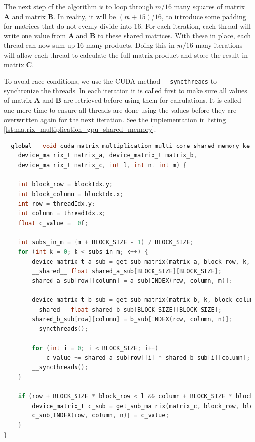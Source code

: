 The next step of the algorithm is to loop through $m / 16$ many squares of matrix $\mathbf{A}$ and matrix $\mathbf{B}$. In reality, it will be $(m + 15) / 16$, to introduce some padding for matrices that do not evenly divide into 16. For each iteration, each thread will write one value from $\mathbf{A}$ and $\mathbf{B}$ to these shared matrices. With these in place, each thread can now sum up 16 many products. Doing this in $m / 16$ many iterations will allow each thread to calculate the full matrix product and store the result in matrix $\mathbf{C}$. 

To avoid race conditions, we use the CUDA method \texttt{\_\_syncthreads} to synchronize the threads. In each iteration it is called first to make sure all values of matrix $\mathbf{A}$ and $\mathbf{B}$ are retrieved before using them for calculations. It is called one more time to ensure all threads are done using the values before they are overwritten again for the next iteration. See the implementation in listing \ref{lst:matrix_multiplication_gpu_shared_memory}. 

\begin{lstlisting}[language=C, caption={Shared Memory Matrix Multiplication}, label={lst:matrix_multiplication_gpu_shared_memory}]
__global__ void cuda_matrix_multiplication_multi_core_shared_memory_kernel(
    device_matrix_t matrix_a, device_matrix_t matrix_b,
    device_matrix_t matrix_c, int l, int n, int m) {
    
    int block_row = blockIdx.y;
    int block_column = blockIdx.x;
    int row = threadIdx.y;
    int column = threadIdx.x;
    float c_value = .0f;

    int subs_in_m = (m + BLOCK_SIZE - 1) / BLOCK_SIZE;
    for (int k = 0; k < subs_in_m; k++) {
        device_matrix_t a_sub = get_sub_matrix(matrix_a, block_row, k, m);
        __shared__ float shared_a_sub[BLOCK_SIZE][BLOCK_SIZE];
        shared_a_sub[row][column] = a_sub[INDEX(row, column, m)];

        device_matrix_t b_sub = get_sub_matrix(matrix_b, k, block_column, n);
        __shared__ float shared_b_sub[BLOCK_SIZE][BLOCK_SIZE];
        shared_b_sub[row][column] = b_sub[INDEX(row, column, n)];
        __syncthreads();

        for (int i = 0; i < BLOCK_SIZE; i++) 
            c_value += shared_a_sub[row][i] * shared_b_sub[i][column];
        __syncthreads();
    }

    if (row + BLOCK_SIZE * block_row < l && column + BLOCK_SIZE * block_column  < n) {
        device_matrix_t c_sub = get_sub_matrix(matrix_c, block_row, block_column, n);
        c_sub[INDEX(row, column, n)] = c_value;
    } 
}
\end{lstlisting}

